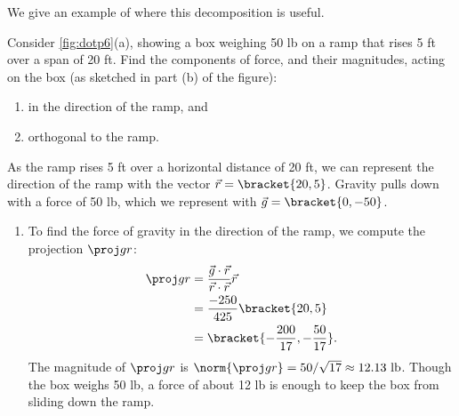 We give an example of where this decomposition is useful.

\begin{example}\label{ex_dotp6}
Consider \autoref{fig:dotp6}(a), showing a box weighing 50 lb on a ramp that rises 5 ft over a span of 20 ft. Find the components of force, and their magnitudes, acting on the box (as sketched in part (b) of the figure):
%
%
\begin{enumerate}
	\item in the direction of the ramp, and
	\item	orthogonal to the ramp.
\end{enumerate}
\solution
As the ramp rises 5 ft over a horizontal distance of 20 ft, we can represent the direction of the ramp with the vector $\vec r=\bracket{20,5}$. Gravity pulls down with a force of 50 lb, which we represent with $\vec g =\bracket{0,-50}$. 
\begin{enumerate}
	\item To find the force of gravity in the direction of the ramp, we compute the projection $\proj gr$:\vspace{-.5\baselineskip}
	\begin{align*}
	\proj gr &= \frac{\vec g\cdot\vec r}{\vec r\cdot\vec r}\vec r\\
	&=  \frac{-250}{425}\bracket{20,5}\\
	&=\bracket{-\frac{200}{17},-\frac{50}{17}}%
	.
	\end{align*}
	The magnitude of $\proj gr$ is $\norm{\proj gr} = 50/\sqrt{17} \approx 12.13\text{ lb}$. Though the box weighs 50 lb, a force of about 12 lb is enough to keep the box from sliding down the ramp.
	

\end{enumerate}
\end{example}
